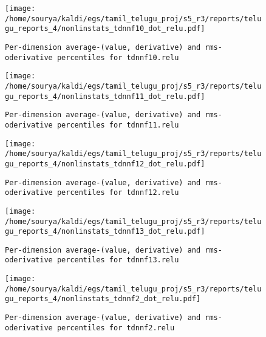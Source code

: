 \documentclass[prl,10pt,twocolumn]{revtex4}
\begin{document}
\newpage
\begin{figure}[h]
  \begin{center}
    \caption{\texttt{Per-dimension average-(value, derivative) and rms-oderivative percentiles for tdnnf10.relu}}
    \texttt{[image: /home/sourya/kaldi/egs/tamil\_telugu\_proj/s5\_r3/reports/telugu\_reports\_4/nonlinstats\_tdnnf10\_dot\_relu.pdf]}
  \end{center}
\end{figure}
\clearpage


\newpage
\begin{figure}[h]
  \begin{center}
    \caption{\texttt{Per-dimension average-(value, derivative) and rms-oderivative percentiles for tdnnf11.relu}}
    \texttt{[image: /home/sourya/kaldi/egs/tamil\_telugu\_proj/s5\_r3/reports/telugu\_reports\_4/nonlinstats\_tdnnf11\_dot\_relu.pdf]}
  \end{center}
\end{figure}
\clearpage


\newpage
\begin{figure}[h]
  \begin{center}
    \caption{\texttt{Per-dimension average-(value, derivative) and rms-oderivative percentiles for tdnnf12.relu}}
    \texttt{[image: /home/sourya/kaldi/egs/tamil\_telugu\_proj/s5\_r3/reports/telugu\_reports\_4/nonlinstats\_tdnnf12\_dot\_relu.pdf]}
  \end{center}
\end{figure}
\clearpage


\newpage
\begin{figure}[h]
  \begin{center}
    \caption{\texttt{Per-dimension average-(value, derivative) and rms-oderivative percentiles for tdnnf13.relu}}
    \texttt{[image: /home/sourya/kaldi/egs/tamil\_telugu\_proj/s5\_r3/reports/telugu\_reports\_4/nonlinstats\_tdnnf13\_dot\_relu.pdf]}
  \end{center}
\end{figure}
\clearpage


\newpage
\begin{figure}[h]
  \begin{center}
    \caption{\texttt{Per-dimension average-(value, derivative) and rms-oderivative percentiles for tdnnf2.relu}}
    \texttt{[image: /home/sourya/kaldi/egs/tamil\_telugu\_proj/s5\_r3/reports/telugu\_reports\_4/nonlinstats\_tdnnf2\_dot\_relu.pdf]}
  \end{center}
\end{figure}
\clearpage
\end{document}
